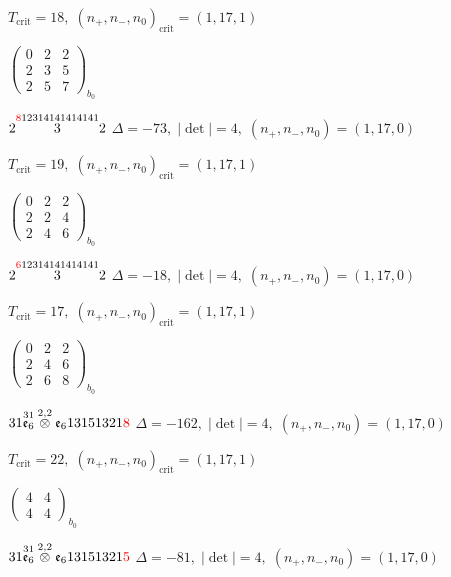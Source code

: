 \documentclass[10pt]{article}
\begin{document}
\hspace{1em}$T_{\text{crit}}=18,\; (n_+,n_-,n_0)_{\text{crit}}=(1,17,1)$

\hspace{2em}$\left(\begin{smallmatrix}0 & 2 & 2 \\ 2 & 3 & 5 \\ 2 & 5 & 7\end{smallmatrix}\right)_{\!b_0}$

$2\overset{\textcolor{red}{8}12314141414141}{3}2$ \quad $\Delta=-73,\; |\det|=4,\; (n_+,n_-,n_0)=(1,17,0)$

\hspace{1em}$T_{\text{crit}}=19,\; (n_+,n_-,n_0)_{\text{crit}}=(1,17,1)$

\hspace{2em}$\left(\begin{smallmatrix}0 & 2 & 2 \\ 2 & 2 & 4 \\ 2 & 4 & 6\end{smallmatrix}\right)_{\!b_0}$

$2\overset{\textcolor{red}{6}12314141414141}{3}2$ \quad $\Delta=-18,\; |\det|=4,\; (n_+,n_-,n_0)=(1,17,0)$

\hspace{1em}$T_{\text{crit}}=17,\; (n_+,n_-,n_0)_{\text{crit}}=(1,17,1)$

\hspace{2em}$\left(\begin{smallmatrix}0 & 2 & 2 \\ 2 & 4 & 6 \\ 2 & 6 & 8\end{smallmatrix}\right)_{\!b_0}$

\smallskip

$31\overset{31}{\mathfrak{e}_6}\overset{2,2}{\otimes}\mathfrak{e}_613151321\textcolor{red}{8}$ \quad $\Delta=-162,\; |\det|=4,\; (n_+,n_-,n_0)=(1,17,0)$

\hspace{1em}$T_{\text{crit}}=22,\; (n_+,n_-,n_0)_{\text{crit}}=(1,17,1)$

\hspace{2em}$\left(\begin{smallmatrix}4 & 4 \\ 4 & 4\end{smallmatrix}\right)_{\!b_0}$

$31\overset{31}{\mathfrak{e}_6}\overset{2,2}{\otimes}\mathfrak{e}_613151321\textcolor{red}{5}$ \quad $\Delta=-81,\; |\det|=4,\; (n_+,n_-,n_0)=(1,17,0)$
\end{document}
